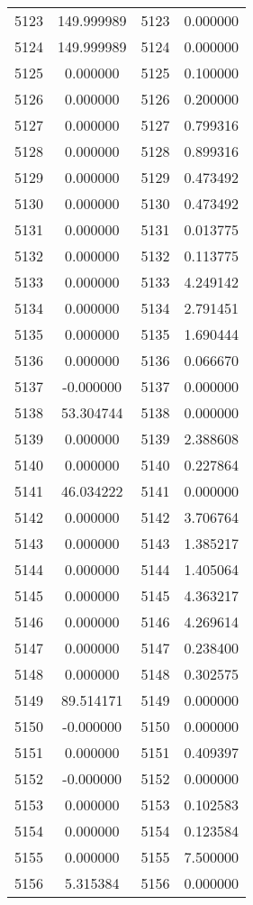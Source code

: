 \documentclass[12pt]{article}
\begin{document}
\begin{longtable}{@{}cccc@{}}
5123 & 149.999989 & 5123 & 0.000000 \\
5124 & 149.999989 & 5124 & 0.000000 \\
5125 & 0.000000 & 5125 & 0.100000 \\
5126 & 0.000000 & 5126 & 0.200000 \\
5127 & 0.000000 & 5127 & 0.799316 \\
5128 & 0.000000 & 5128 & 0.899316 \\
5129 & 0.000000 & 5129 & 0.473492 \\
5130 & 0.000000 & 5130 & 0.473492 \\
5131 & 0.000000 & 5131 & 0.013775 \\
5132 & 0.000000 & 5132 & 0.113775 \\
5133 & 0.000000 & 5133 & 4.249142 \\
5134 & 0.000000 & 5134 & 2.791451 \\
5135 & 0.000000 & 5135 & 1.690444 \\
5136 & 0.000000 & 5136 & 0.066670 \\
5137 & -0.000000 & 5137 & 0.000000 \\
5138 & 53.304744 & 5138 & 0.000000 \\
5139 & 0.000000 & 5139 & 2.388608 \\
5140 & 0.000000 & 5140 & 0.227864 \\
5141 & 46.034222 & 5141 & 0.000000 \\
5142 & 0.000000 & 5142 & 3.706764 \\
5143 & 0.000000 & 5143 & 1.385217 \\
5144 & 0.000000 & 5144 & 1.405064 \\
5145 & 0.000000 & 5145 & 4.363217 \\
5146 & 0.000000 & 5146 & 4.269614 \\
5147 & 0.000000 & 5147 & 0.238400 \\
5148 & 0.000000 & 5148 & 0.302575 \\
5149 & 89.514171 & 5149 & 0.000000 \\
5150 & -0.000000 & 5150 & 0.000000 \\
5151 & 0.000000 & 5151 & 0.409397 \\
5152 & -0.000000 & 5152 & 0.000000 \\
5153 & 0.000000 & 5153 & 0.102583 \\
5154 & 0.000000 & 5154 & 0.123584 \\
5155 & 0.000000 & 5155 & 7.500000 \\
5156 & 5.315384 & 5156 & 0.000000 \\

\end{longtable}
\end{document}
